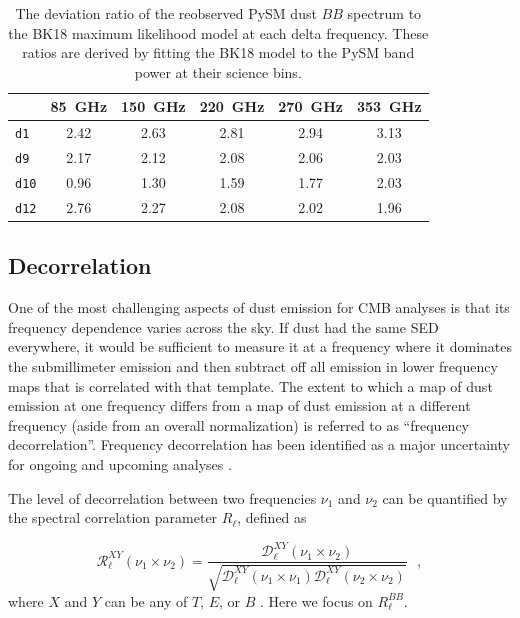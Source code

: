 \documentclass[twocolumn]{aastex631}
\begin{document}
\begin{table}
    \centering
    \begin{tabular}{lccccc}
    \toprule 
     & 85~GHz & 150~GHz & 220~GHz & 270~GHz & 353~GHz \\
    \midrule
    \texttt{d1}  & 2.42	& 2.63 & 2.81 & 2.94 & 3.13 \\
    \texttt{d9}  & 2.17 & 2.12 & 2.08 & 2.06 & 2.03 \\
    \texttt{d10} & 0.96 & 1.30 & 1.59 & 1.77 & 2.03 \\
    \texttt{d12} & 2.76	& 2.27 & 2.08 & 2.02 & 1.96 \\
   \bottomrule
    \end{tabular}
    \caption{The deviation ratio of the reobserved PySM dust $BB$ spectrum to the BK18 maximum likelihood model at each delta frequency. These ratios are derived by fitting the BK18 model to the PySM band power at their science bins.}
    \label{tab:BB_dustratio}
\end{table}


\subsection{Decorrelation} \label{subsec:decorrelation}

One of the most challenging aspects of dust emission for CMB analyses is that its frequency dependence varies across the sky. If dust had the same SED everywhere, it would be sufficient to measure it at a frequency where it dominates the submillimeter emission and then subtract off all emission in lower frequency maps that is correlated with that template. The extent to which a map of dust emission at one frequency differs from a map of dust emission at a different frequency (aside from an overall normalization) is referred to as ``frequency decorrelation''. Frequency decorrelation has been identified as a major uncertainty for ongoing and upcoming analyses \citep{Ade:2021}.

The level of decorrelation between two frequencies $\nu_1$ and $\nu_2$ can be quantified by the spectral correlation parameter $R_\ell$, defined as

\begin{equation} \label{eq:R_ell}
    \mathcal{R}^{XY}_\ell(\nu_1\times\nu_2) = \frac{\mathcal{D}_\ell^{XY}(\nu_1\times\nu_2)}{\sqrt{\mathcal{D}_\ell^{XY}(\nu_1\times\nu_1)\mathcal{D}_\ell^{XY}(\nu_2\times\nu_2)}}
    ~~~,
\end{equation}
where $X$ and $Y$ can be any of $T$, $E$, or $B$ \citep{planck2016-L}. Here we focus on $R_\ell^{BB}$.
\end{document}
